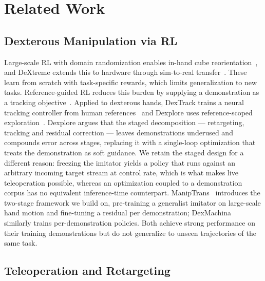 \documentclass[letterpaper, 10 pt, conference]{ieeeconf}
\begin{document}
\section{Related Work}

\subsection{Dexterous Manipulation via RL}

Large-scale RL with domain randomization enables in-hand cube
reorientation~\cite{openai_cube}, and DeXtreme extends this to hardware through
sim-to-real transfer~\cite{dextreme}. These learn from scratch with task-specific
rewards, which limits generalization to new tasks. Reference-guided RL reduces this
burden by supplying a demonstration as a tracking objective~\cite{deepmimic}. Applied to
dexterous hands, DexTrack trains a neural tracking controller from human
references~\cite{dextrack} and Dexplore uses reference-scoped
exploration~\cite{dexplore}. Dexplore argues that the staged decomposition ---
retargeting, tracking and residual correction --- leaves demonstrations underused and
compounds error across stages, replacing it with a single-loop optimization that treats
the demonstration as soft guidance. We retain the staged design for a different reason:
freezing the imitator yields a policy that runs against an arbitrary incoming target
stream at control rate, which is what makes live teleoperation possible, whereas an
optimization coupled to a demonstration corpus has no equivalent inference-time
counterpart. ManipTrans~\cite{maniptrans} introduces the two-stage framework we build
on, pre-training a generalist imitator on large-scale hand motion and fine-tuning a
residual per demonstration; DexMachina~\cite{dexmachina} similarly trains
per-demonstration policies. Both achieve strong performance on their training
demonstrations but do not generalize to unseen trajectories of the same task.

\subsection{Teleoperation and Retargeting}
\end{document}
